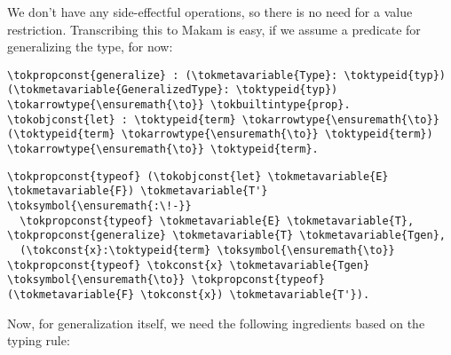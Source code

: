 \vspace{-1.2em}\begin{mathpar}
\end{mathpar}

We don't have any side-effectful operations, so there is no need for a
value restriction. Transcribing this to Makam is easy, if we assume a
predicate for generalizing the type, for now:

\begin{verbatim}
\tokpropconst{generalize} : (\tokmetavariable{Type}: \toktypeid{typ}) (\tokmetavariable{GeneralizedType}: \toktypeid{typ}) \tokarrowtype{\ensuremath{\to}} \tokbuiltintype{prop}.
\tokobjconst{let} : \toktypeid{term} \tokarrowtype{\ensuremath{\to}} (\toktypeid{term} \tokarrowtype{\ensuremath{\to}} \toktypeid{term}) \tokarrowtype{\ensuremath{\to}} \toktypeid{term}.
\end{verbatim}

\importantCodeblock{}

\begin{verbatim}
\tokpropconst{typeof} (\tokobjconst{let} \tokmetavariable{E} \tokmetavariable{F}) \tokmetavariable{T'} \toksymbol{\ensuremath{:\!-}}
  \tokpropconst{typeof} \tokmetavariable{E} \tokmetavariable{T}, \tokpropconst{generalize} \tokmetavariable{T} \tokmetavariable{Tgen},
  (\tokconst{x}:\toktypeid{term} \toksymbol{\ensuremath{\to}} \tokpropconst{typeof} \tokconst{x} \tokmetavariable{Tgen} \toksymbol{\ensuremath{\to}} \tokpropconst{typeof} (\tokmetavariable{F} \tokconst{x}) \tokmetavariable{T'}).
\end{verbatim}

\importantCodeblockEnd{}

Now, for generalization itself, we need the following ingredients based
on the typing rule:


